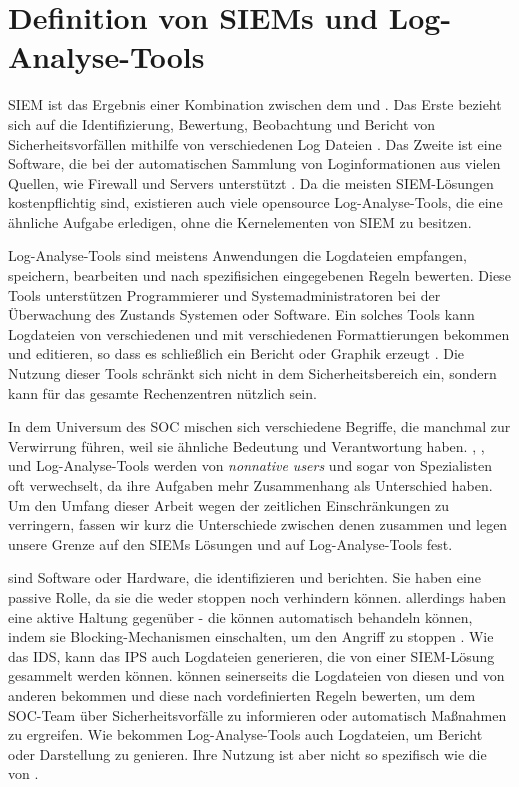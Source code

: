 \section{Definition von SIEMs und Log-Analyse-Tools}

\gls{SIEM} ist das Ergebnis einer Kombination zwischen dem  und  \citep{Dorigo_SIEM}. Das Erste bezieht sich auf die Identifizierung, Bewertung, Beobachtung und Bericht von Sicherheitsvorfällen mithilfe von verschiedenen Log Dateien \citep{techopedia_SEM}. Das Zweite ist eine Software, die bei der automatischen Sammlung von Loginformationen aus vielen Quellen, wie Firewall und Servers unterstützt \citep{techopedia_SIM}. Da die meisten \gls{SIEM}-Lösungen kostenpflichtig sind, existieren auch viele \gls{opensource} Log-Analyse-Tools, die eine ähnliche Aufgabe erledigen, ohne die Kernelementen von \gls{SIEM} zu besitzen. 

Log-Analyse-Tools sind meistens Anwendungen die Logdateien empfangen, speichern, bearbeiten und nach spezifisichen eingegebenen Regeln bewerten. Diese Tools unterstützen Programmierer und Systemadministratoren bei der Überwachung des Zustands Systemen oder Software. Ein solches Tools kann Logdateien von verschiedenen  und mit verschiedenen Formattierungen bekommen und editieren, so dass es schließlich ein Bericht oder Graphik erzeugt \citep{Korzeniowski_LATDef}. Die Nutzung dieser Tools schränkt sich nicht in dem Sicherheitsbereich ein, sondern kann für das gesamte Rechenzentren nützlich sein.


In dem Universum des \gls{SOC} mischen sich verschiedene Begriffe, die manchmal zur Verwirrung führen, weil sie ähnliche Bedeutung und Verantwortung haben. , ,  und Log-Analyse-Tools werden von \textit{nonnative users}  und sogar von Spezialisten oft verwechselt, da ihre Aufgaben mehr Zusammenhang als Unterschied haben. Um den Umfang dieser Arbeit wegen der zeitlichen Einschränkungen zu verringern, fassen wir kurz die Unterschiede zwischen denen zusammen und legen unsere Grenze auf den \glspl{SIEM} Lösungen und auf Log-Analyse-Tools fest. 

\newpage
{} sind Software oder Hardware, die  identifizieren und berichten. Sie haben eine passive Rolle, da sie die  weder stoppen noch verhindern können. allerdings haben eine aktive Haltung gegenüber  - die können automatisch behandeln können, indem sie Blocking-Mechanismen einschalten, um den Angriff zu stoppen \citep{Wendzel_IS}. Wie das \gls{IDS}, kann das \gls{IPS} auch Logdateien generieren, die von einer \gls{SIEM}-Lösung gesammelt werden können.  können seinerseits die Logdateien von diesen und von anderen  bekommen und diese nach vordefinierten Regeln bewerten, um dem \gls{SOC}-Team über Sicherheitsvorfälle zu informieren oder automatisch Maßnahmen zu ergreifen. Wie  bekommen Log-Analyse-Tools auch Logdateien, um Bericht oder Darstellung zu genieren. Ihre Nutzung ist aber nicht so spezifisch wie die von . 

